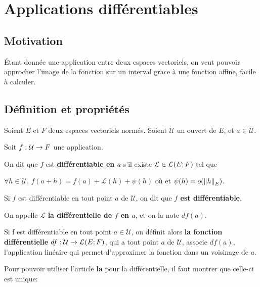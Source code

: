 \chapter{Applications différentiables}
\label{chap:differential}
\section*{Motivation}
	Étant donnée une application entre deux espaces vectoriels, on veut pouvoir
	approcher l'image de la fonction sur un interval grace à une fonction
	affine, facile à calculer.


\section{Définition et propriétés}


\begin{definition} 
\label{a_differential}
	Soient $E$ et $F$ deux espaces vectoriels normés.
	Soient $\mathcal{U}$ un ouvert de $E$, et $a \in \mathcal{U}$.

	Soit $f : \mathcal{U} \rightarrow F$ une application.

	On dit que $f$ est \textbf{différentiable en $a$} s'il existe $\mathcal{L}
	\in \mathcal{L}_{}(E; F)$ tel que

	$\forall h \in \mathcal{U}$,
	$f(a + h) = f(a) + \mathcal{L}(h) + \psi(h)$ où
	et $\psi(h) = o(\norm{h}_{E})$.
\end{definition}

\begin{remarque}
	Si $f$ est différentiable en tout point $a$ de $\mathcal{U}$, on dit que
	\textbf{$f$ est différentiable}.
\end{remarque}

On appelle $\mathcal{L}$ \textbf{la différentielle de $f$ en $a$}, et on la note
$df(a)$.

Si f est différentiable en tout point $a \in \mathcal{U}$, on définit alors
\textbf{la fonction différentielle}
$df : \mathcal{U} \rightarrow \mathcal{L}_{}(E; F)$, qui a tout point $a$
de $\mathcal{U}$, associe $df(a)$, l'application linéaire qui permet
d'approximer la fonction dans un voisinage de $a$.

Pour pouvoir utiliser l'article \textbf{la} pour la différentielle, il faut
montrer que celle-ci est unique:

